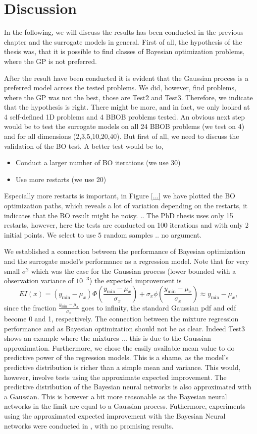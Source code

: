 \chapter{Discussion}
In the following, we will discuss the results has been conducted in the previous chapter and the
surrogate models in general. First of all, the hypothesis of the thesis was, that it is possible 
to find classes of Bayesian optimization problems, where the GP is not preferred. 

After the result have been conducted it is evident that the Gaussian process is a preferred model
across the tested problems. We did, however, find problems, where the GP was not the best, those are
Test2 and Test3. Therefore, we indicate that the hypothesis is right. There might be more, and in
fact, we only looked at 4 self-defined 1D problems and 4 BBOB problems tested. An obvious next step
would be to test the surrogate models on all 24 BBOB problems (we test on 4) and for all dimensions
(2,3,5,10,20,40). But first of all, we need to discuss the validation of the BO test. A better test
would be to,
\begin{itemize}[noitemsep]
    \item Conduct a larger number of BO iterations (we use 30)
    \item Use more restarts (we use 20)
\end{itemize}
Especially more restarts is important, in Figure \ref{...} we have plotted the BO optimization
paths, which reveals a lot of variation depending on the restarts, it indicates that the BO result
might be noisy. .. The PhD thesis \cite{PhDthesis} uses only 15 restarts, however, here the tests are
conducted on 100 iterations and with only 2 initial points. We select to use 5 random samples .. no
argument. 

We established a connection between the performance of Bayesian optimization and the surrogate
model's performance as a regression model. Note that for very small $\sigma^2$ which was the case
for the Gaussian process (lower bounded with a observation variance of $10^{-3}$) the expected improvement
is $$EI(x) = (y_{\min}-\mu_x)\Phi\left(\frac{y_{\min}-\mu_x}{\sigma_x}\right)+ \sigma_x
\phi\left(\frac{y_{\min}-\mu_x}{\sigma_x}\right) \approx y_{\min}-\mu_x,$$ since the fraction $\frac{y_{\min}-\mu_x}{\sigma_x}$
goes to infinity, the standard Gaussian pdf and cdf become 0 and 1, respectively. The connection 
between the mixture regression performance and as Bayesian optimization should not be as clear. Indeed 
Test3 shows an example where the mixtures ... this is due to the Gaussian approximation. Furthermore,
we chose the easily available mean value to do predictive power of the regression models. This is a shame, 
as the model's predictive distribution is richer than a simple mean and variance. This 
would, however, involve tests using the approximate expected improvement. The predictive distribution
of the Bayesian neural networks is also approximated with a Gaussian. This is however a bit more 
reasonable as the Bayesian neural networks in the limit are equal to a Gaussian process. Futhermore,
experiments using the approximated expected improvement with the Bayesian Neural networks were 
conducted in \cite{PhDthesis}, with no promising results. 


